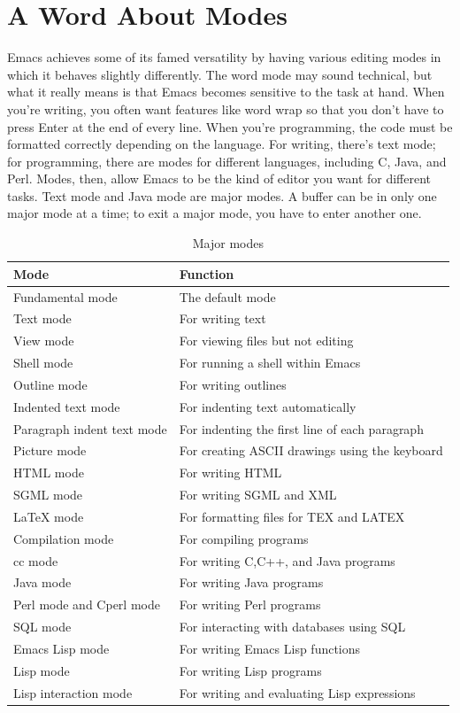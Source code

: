 \documentclass[12pt]{book}
\begin{document}
\section{A Word About Modes}
Emacs achieves some of its famed versatility by having various editing modes in which it behaves slightly differently. The word mode may sound technical, but what it really means is that Emacs becomes sensitive to the task at hand. When you're writing, you often want features like word wrap so that you don't have to press Enter at the end of every line. When you're programming, the code must be formatted correctly depending on the language. For writing, there's text mode; for programming, there are modes for different languages, including C, Java, and Perl. Modes, then, allow Emacs to be the kind of editor you want for different tasks. Text mode and Java mode are major modes. A buffer can be in only one major mode at a time; to exit a major mode, you have to enter another one. 
\begin{table}[H]
	\begin{center}
\begin{tabular}[H]{|l|l|}
\hline
Mode & Function\\
\hline
Fundamental mode & The default mode\\
Text mode & For writing text\\
View mode & For viewing files but not editing\\
Shell mode & For running a shell within Emacs\\
Outline mode & For writing outlines\\
Indented text mode & For indenting text automatically\\
Paragraph indent text mode & For indenting the first line of each paragraph\\
Picture mode & For creating ASCII drawings using the keyboard\\
HTML mode & For writing HTML\\
SGML mode & For writing SGML and XML\\
LaTeX mode & For formatting files for TEX and LATEX\\
Compilation mode & For compiling programs\\
cc mode & For writing C,C++, and Java programs\\
Java mode & For writing Java programs\\
Perl mode and Cperl mode &For writing Perl programs\\
SQL mode &
For interacting with databases using SQL\\
Emacs Lisp mode & For writing Emacs Lisp functions\\
Lisp mode & For writing Lisp programs\\
Lisp interaction mode & For writing and evaluating Lisp expressions\\
\hline
\end{tabular}
\end{center}
\caption{Major modes}
\end{table}
\end{document}
